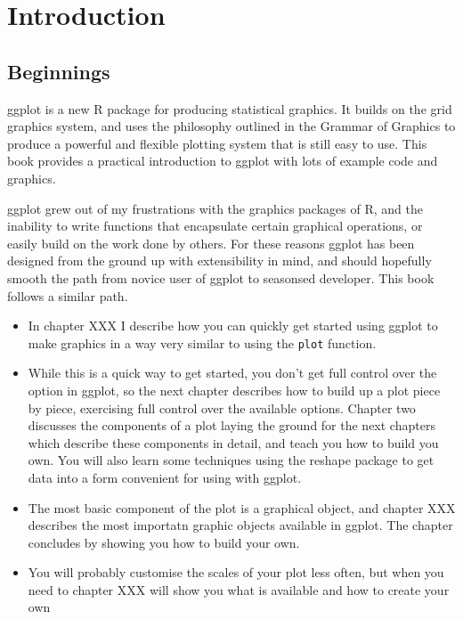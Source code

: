 


\chapter{Introduction}


\section{Beginnings}\label{sec:beginnings}

ggplot is a new R package for producing statistical graphics.  It builds on the grid graphics system, and uses the philosophy outlined in the Grammar of Graphics to produce a powerful and flexible plotting system that is still easy to use.  This book provides a practical introduction to ggplot with lots of example code and graphics.  

ggplot grew out of my frustrations with the graphics packages of R, and the inability to write functions that encapsulate certain graphical operations, or easily build on the work done by others.  For these reasons ggplot has been designed from the ground up with extensibility in mind, and should hopefully smooth the path from novice user of ggplot to seasonsed developer.  This book follows a similar path. 

\begin{itemize}
	\item In chapter XXX I describe how you can quickly get started using ggplot to make graphics in a way very similar to using the {\tt plot} function. 
	
	\item While this is a quick way to get started, you don't get full control over the option in ggplot, so the next chapter describes how to build up a plot piece by piece, exercising full control over the available options.  Chapter two discusses the components of a plot laying the ground for the next chapters which describe these components in detail, and teach you how to build you own.  You will also learn some techniques using the reshape package to get data into a form convenient for using with ggplot.

	\item The most basic component of the plot is a graphical object, and chapter XXX describes the most importatn graphic objects available in ggplot.  The chapter concludes by showing you how to build your own.

	\item You will probably customise the scales of your plot less often, but when you need to chapter XXX will show you what is available and how to create your own

\end{itemize}

